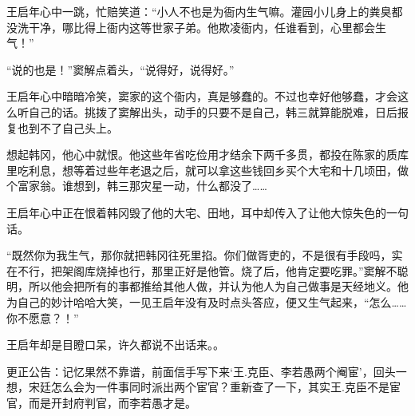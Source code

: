 王启年心中一跳，忙赔笑道：“小人不也是为衙内生气嘛。灌园小儿身上的粪臭都没洗干净，哪比得上衙内这等世家子弟。他欺凌衙内，任谁看到，心里都会生气！”

“说的也是！”窦解点着头，“说得好，说得好。”

王启年心中暗暗冷笑，窦家的这个衙内，真是够蠢的。不过也幸好他够蠢，才会这么听自己的话。挑拨了窦解出头，动手的只要不是自己，韩三就算能脱难，日后报复也到不了自己头上。

想起韩冈，他心中就恨。他这些年省吃俭用才结余下两千多贯，都投在陈家的质库里吃利息，想等着过些年老退之后，就可以拿这些钱回乡买个大宅和十几顷田，做个富家翁。谁想到，韩三那灾星一动，什么都没了……

王启年心中正在恨着韩冈毁了他的大宅、田地，耳中却传入了让他大惊失色的一句话。

“既然你为我生气，那你就把韩冈往死里掐。你们做胥吏的，不是很有手段吗，实在不行，把架阁库烧掉也行，那里正好是他管。烧了后，他肯定要吃罪。”窦解不聪明，所以他会把所有的事都推给其他人做，并认为他人为自己做事是天经地义。他为自己的妙计哈哈大笑，一见王启年没有及时点头答应，便又生气起来，“怎么……你不愿意？！”

王启年却是目瞪口呆，许久都说不出话来。。

更正公告：记忆果然不靠谱，前面信手写下来‘王.克臣、李若愚两个阉宦’，回头一想，宋廷怎么会为一件事同时派出两个宦官？重新查了一下，其实王.克臣不是宦官，而是开封府判官，而李若愚才是。

